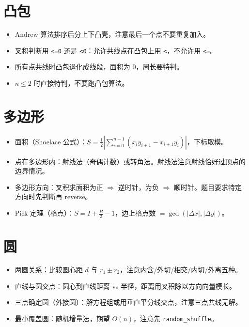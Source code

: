 \documentclass[UTF8,openany,oneside,zihao=-4]{ctexbook}
\begin{document}
\section{凸包}

\begin{warn}
\begin{itemize}
  \item Andrew 算法排序后分上下凸壳，注意最后一个点不要重复加入。
  \item 叉积判断用 \lstinline|<=0| 还是 \lstinline|<0|：允许共线点在凸包上用 \lstinline|<|，不允许用 \lstinline|<=|。
  \item 所有点共线时凸包退化成线段，面积为 0，周长要特判。
  \item $n \le 2$ 时直接特判，不要跑凸包算法。
\end{itemize}
\end{warn}

\section{多边形}

\begin{itemize}
  \item 面积（Shoelace 公式）：$S = \frac{1}{2}\left|\sum_{i=0}^{n-1}(x_i y_{i+1} - x_{i+1} y_i)\right|$，下标取模。
  \item 点在多边形内：射线法（奇偶计数）或转角法。射线法注意射线恰好过顶点的边界情况。
  \item 多边形方向：叉积求面积为正 $\Rightarrow$ 逆时针，为负 $\Rightarrow$ 顺时针。题目要求特定方向时先判断再 reverse。
  \item Pick 定理（格点）：$S = I + \frac{B}{2} - 1$，边上格点数 $= \gcd(|\Delta x|, |\Delta y|)$。
\end{itemize}

\section{圆}

\begin{itemize}
  \item 两圆关系：比较圆心距 $d$ 与 $r_1 \pm r_2$，注意内含/外切/相交/内切/外离五种。
  \item 直线与圆交点：圆心到直线距离 vs 半径，距离用叉积除以方向向量模长。
  \item 三点确定圆（外接圆）：解方程组或用垂直平分线交点，注意三点共线无解。
  \item 最小覆盖圆：随机增量法，期望 $O(n)$，注意先 \lstinline|random_shuffle|。
\end{itemize}
\end{document}
